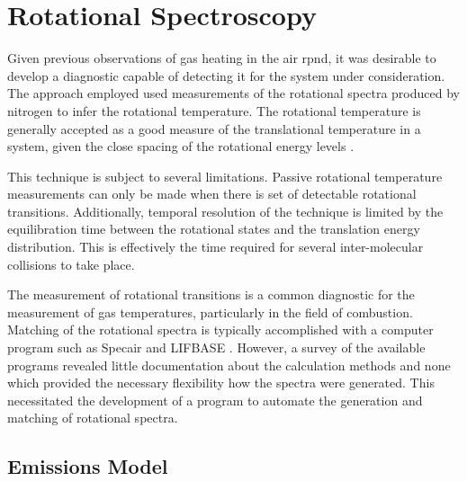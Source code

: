 \section{Rotational Spectroscopy}

Given previous observations of gas heating in the air \acs{rpnd}, it was
desirable to develop a diagnostic capable of detecting it for the system under
consideration. The approach employed used measurements of the rotational spectra
produced by nitrogen to infer the rotational temperature. The rotational
temperature is generally accepted as a good measure of the translational
temperature in a system, given the close spacing of the rotational energy levels
\cite{Laux1993}.

This technique is subject to several limitations. Passive rotational temperature
measurements can only be made when there is set of detectable rotational
transitions. Additionally, temporal resolution of the technique is limited by
the equilibration time between the rotational states and the translation energy
distribution. This is effectively the time required for several inter-molecular
collisions to take place. 

The measurement of rotational transitions is a common diagnostic for the
measurement of gas temperatures, particularly in the field of combustion.
Matching of the rotational spectra is typically accomplished with a computer
program such as Specair \cite{Laux2002} and LIFBASE \cite{Luque1999}. However, a
survey of the available programs revealed little documentation about the
calculation methods and none which provided the necessary flexibility how the
spectra were generated. This necessitated the development of a program to
automate the generation and matching of rotational spectra.

\subsection{Emissions Model}

